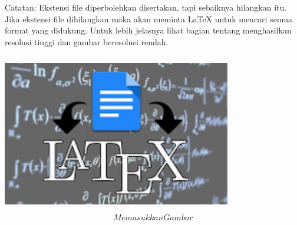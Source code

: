 \vspace{12pt}
\vspace{12pt}
\noindent 
Catatan: Ekstensi file diperbolehkan disertakan, tapi sebaiknya hilangkan itu. Jika ekstensi file dihilangkan maka akan meminta LaTeX untuk mencari semua format yang didukung. Untuk lebih jelasnya lihat bagian tentang menghasilkan resolusi tinggi dan gambar beresolusi rendah. \par
\vspace{12pt}
\vspace{12pt}
\noindent 

\includegraphics[width=10cm,height=7cm]{gambar/dapi14.jpg}
\begin{equation}Memasukkan Gambar \end{equation}


